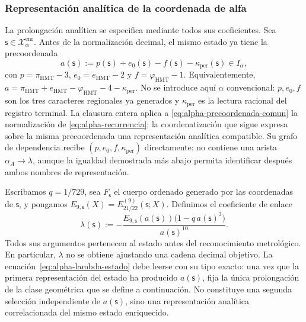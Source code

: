 \subsubsection{Representación analítica de la coordenada de alfa}
\label{subsec:alpha-lector-completo-rev08}

La prolongación analítica se especifica mediante todos sus coeficientes.
Sea \(\mathsf s\in\mathcal X_\alpha^{\mathrm{enr}}\). Antes
de la normalización decimal, el mismo estado ya tiene la precoordenada
\begin{equation}
 a(\mathsf s):=p(\mathsf s)+e_0(\mathsf s)-f(\mathsf s)
                 -\kappa_{\mathrm{per}}(\mathsf s)\in I_\alpha,
 \label{eq:alpha-precoordenada-comun}
\end{equation}
con \(p=\pi_{\mathrm{HMT}}-3\),
\(e_0=e_{\mathrm{HMT}}-2\) y
\(f=\varphi_{\mathrm{HMT}}-1\). Equivalentemente,
\(a=\pi_{\mathrm{HMT}}+e_{\mathrm{HMT}}-
\varphi_{\mathrm{HMT}}-4-\kappa_{\mathrm{per}}\). No se introduce aquí
\(\alpha\) convencional: \(p,e_0,f\) son los tres caracteres regionales ya
generados y \(\kappa_{\mathrm{per}}\) es la lectura racional del registro
terminal. La clausura entera aplica a
\eqref{eq:alpha-precoordenada-comun} la normalización de
\eqref{eq:alpha-recurrencia}; la coordenatización que sigue expresa sobre la misma
precoordenada una representación analítica compatible. Su grafo de
dependencia recibe \((p,e_0,f,\kappa_{\mathrm{per}})\) directamente: no
contiene una arista \(\alpha_A\to\lambda\), aunque la igualdad demostrada más
abajo permita identificar después ambos nombres de representación.

Escribamos \(q=1/729\), sea \(F_{\mathsf s}\) el cuerpo ordenado generado por
las coordenadas de \(\mathsf s\), y pongamos
\(E_{9,\mathsf s}(X)=E_{21/22}^{(9)}(\mathsf s;X)\). Definimos el coeficiente
de enlace
\begin{equation}
 \lambda(\mathsf s):=
 -\frac{E_{9,\mathsf s}(a(\mathsf s))
         \bigl(1-q\,a(\mathsf s)^3\bigr)}{a(\mathsf s)^{10}}.
 \label{eq:alpha-lambda-estado}
\end{equation}
Todos sus argumentos pertenecen al estado antes del reconocimiento
metrológico. En particular, \(\lambda\) no se obtiene ajustando una cadena
decimal objetivo. La ecuación~\eqref{eq:alpha-lambda-estado} debe leerse con
su tipo exacto: una vez que la primera representación del estado ha producido
\(a(\mathsf s)\), fija la única prolongación de la clase geométrica que se
define a continuación. No constituye una segunda selección independiente de
\(a(\mathsf s)\), sino una representación analítica correlacionada del mismo
estado enriquecido.

